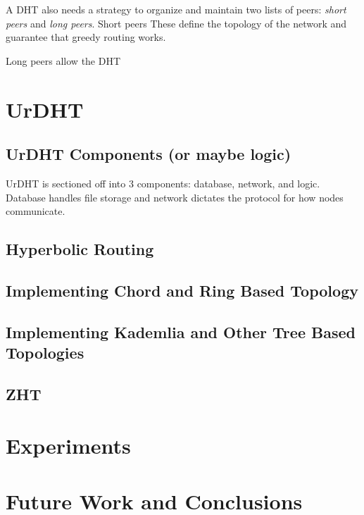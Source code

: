 \documentclass[11pt,conference]{IEEEtran}
\begin{document}
A DHT also needs a strategy to organize and maintain two lists of peers: \textit{short peers} and \textit{long peers}.
Short peers 
These define the topology of the network and guarantee that greedy routing works.

Long peers allow the DHT 
\section{UrDHT}

	\subsection{UrDHT Components (or maybe logic)}
	
	UrDHT is sectioned off into 3 components: database, network, and logic.
	Database handles file storage and network dictates the protocol for how nodes communicate.

	
	\subsection{Hyperbolic Routing}
	\label{sec:hyper}
	
	\subsection{Implementing Chord and Ring Based Topology}
	\subsection{Implementing Kademlia and Other Tree Based Topologies}
	
	\subsection{ZHT}
\section{Experiments}

\section{Future Work and Conclusions}
\end{document}
